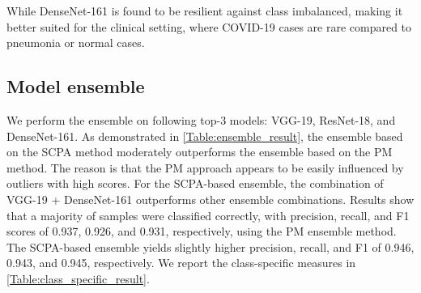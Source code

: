 \documentclass[conference]{IEEEtran}
\begin{document}
While DenseNet-161 is found to be resilient against class imbalanced, making it better suited for the clinical setting, where COVID-19 cases are rare compared to pneumonia or normal cases. %

\subsection{Model ensemble}
\label{model_ensemble}
We perform the ensemble on following top-3 models: VGG-19, ResNet-18, and DenseNet-161. %
As demonstrated in \cref{Table:ensemble_result}, the ensemble based on the SCPA method moderately outperforms the ensemble based on the PM method. The reason is that the PM approach appears to be easily influenced by outliers with high scores. %
For the SCPA-based ensemble, the combination of VGG-19 + DenseNet-161 outperforms other ensemble combinations. Results show that a majority of samples were classified correctly, with precision, recall, and F1 scores of 0.937, 0.926, and 0.931, respectively, using the PM ensemble method.
The SCPA-based ensemble yields slightly higher precision, recall, and F1 of 0.946, 0.943, and 0.945, respectively. We report the class-specific measures in \cref{Table:class_specific_result}. %
\end{document}
